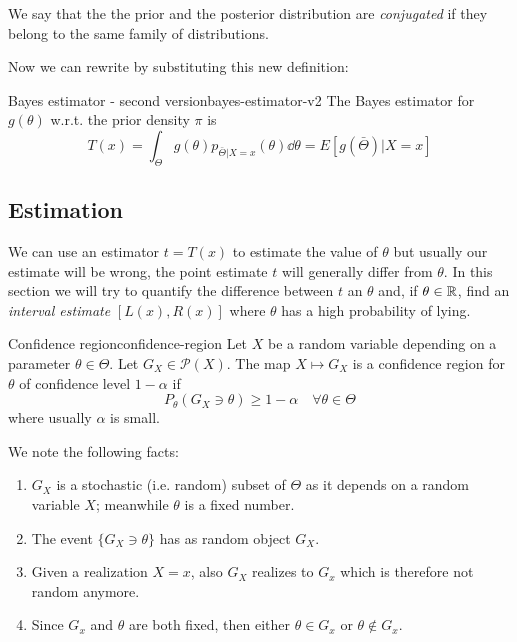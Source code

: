 \documentclass[12pt]{extarticle}
\begin{document}
We say that the the prior and the posterior distribution are \emph{conjugated} if they belong to the same family of distributions.

Now we can rewrite  by substituting this new definition:

\begin{theorem}{Bayes estimator - second version}{bayes-estimator-v2}
    The Bayes estimator for $g(\theta)$ w.r.t. the prior density $\pi$ is
    \begin{equation}
        T(x) = \int_\Theta g(\theta) p_{\bar \Theta | X = x} (\theta) \dd{\theta} = E[g(\bar \Theta) | X = x]
    \end{equation}
\end{theorem}

\subsection{Estimation}

We can use an estimator $t = T(x)$ to estimate the value of $\theta$ but usually our estimate will be wrong, the point estimate $t$ will generally differ from $\theta$.
In this section we will try to quantify the difference between $t$ an $\theta$ and, if $\theta \in \mathbb{R}$, find an \emph{interval estimate} $[L(x), R(x)]$ where $\theta$ has a high probability of lying.

\begin{definition}{Confidence region}{confidence-region}
    Let $X$ be a random variable depending on a parameter $\theta \in \Theta$.
    Let $G_X \in \mathcal P(X)$.
    The map $X \mapsto G_X$ is a confidence region for $\theta$ of confidence level $1-\alpha$ if
    \begin{equation}
        P_\theta(G_X \ni \theta) \geq 1- \alpha \quad \forall \theta \in \Theta
    \end{equation}
    where usually $\alpha$ is small.
\end{definition}

We note the following facts:
\begin{enumerate}
    \item $G_X$ is a stochastic (i.e. random) subset of $\Theta$ as it depends on a random variable $X$; meanwhile $\theta$ is a fixed number.
    \item The event $\{ G_X \ni \theta \}$ has as random object $G_X$.
    \item Given a realization $X = x$, also $G_X$ realizes to $G_x$ which is therefore not random anymore.
    \item Since $G_x$ and $\theta$ are both fixed, then either $\theta \in G_x$ or $\theta \notin G_x$.
\end{enumerate}
\end{document}
